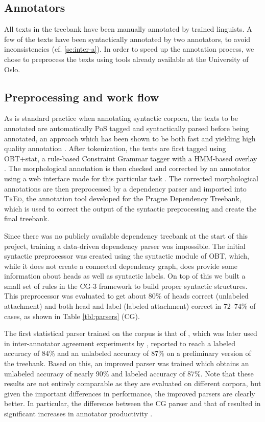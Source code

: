 \documentclass[10pt,a4paper]{article}
\let\app=\textsc
\begin{document}
\subsection{Annotators}
All texts in the treebank have been manually annotated by trained linguists. A
few of the texts have been syntactically annotated by two annotators, to
avoid inconsistencies (cf. \ref{sc:inter-a}). In order to speed up the annotation
process, we chose to preprocess the texts using tools already available at the
University of Oslo.

\subsection{Preprocessing and work flow}
As is standard practice when annotating syntactic corpora, the texts to be
annotated are automatically PoS tagged and syntactically parsed before being
annotated, an approach which has been shown to be both fast and yielding
high quality annotation \cite{Mar:San:Mar:93,For:Sag:10,Skjaerholt:13}.
After tokenization, the texts are first tagged using OBT+stat,
a rule-based Constraint Grammar tagger with a HMM-based overlay \cite{Johannessen:etal:12}.
 The morphological annotation is then checked and corrected by an annotator using a web interface made for this
particular task \cite{Lyn:13}. The corrected morphological annotations are
then preprocessed by a dependency parser and imported into \app{TrEd}, the
annotation tool developed for the Prague Dependency Treebank, which is used to
correct the output of the syntactic preprocessing and create the final
treebank.

Since there was no publicly available dependency treebank at the start
of this project, training a data-driven dependency parser was
impossible. The initial syntactic preprocessor was
created using the syntactic module of OBT, which, while it does not
create a connected dependency graph, does provide some information
about heads as well as syntactic labels. On top of this we built a
small set of rules in the CG-3 framework \cite{Did:2013} to build
proper syntactic structures. This preprocessor was evaluated to get
about 80\% of heads correct (unlabeled attachment) and both head and
label (labeled attachment) correct in 72--74\% of cases, as shown in
Table \ref{tbl:parsers} (CG).

The first statistical parser trained on the corpus is that of
, which was later used in inter-annotator
agreement experiments by , reported to reach a
labeled accuracy of 84\% and an unlabeled accuracy of 87\% on a
preliminary version of the treebank. Based on this, an improved parser
was trained which obtains an unlabeled accuracy of nearly 90\% and
labeled accuracy of 87\%.
Note that these results are not entirely comparable as they
are evaluated on different corpora, but given the important differences in
performance, the improved parsers are clearly better. In particular, the
difference between the CG parser and that of \cite{Skj:Ovr:12} resulted in
significant increases in annotator productivity \cite{Skjaerholt:13}.
\end{document}
